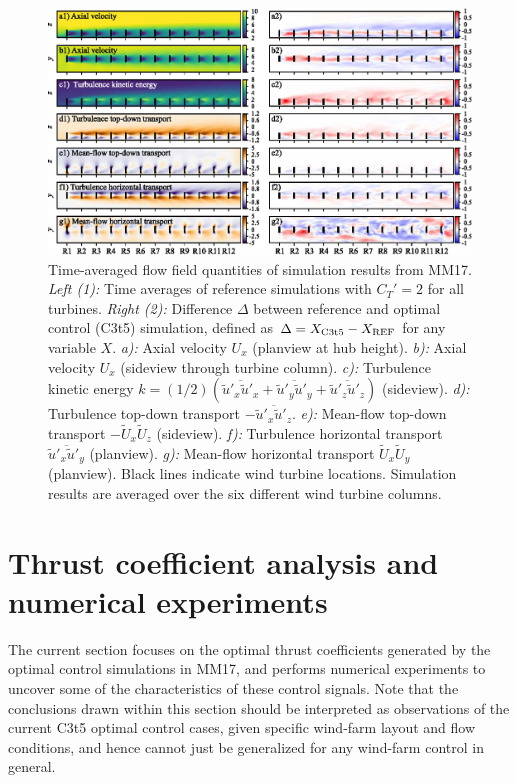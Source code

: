 \documentclass[wes, manuscript]{copernicus}
\newcommand{\revision}[1]{{\color{blue} #1}}
\begin{document}
\begin{figure}
	\includegraphics[width=\textwidth]{figure4}
	\caption{Time-averaged flow field quantities of simulation results from MM17. \emph{Left (1):} Time averages of reference simulations with $C_T' = 2$ for all turbines. \emph{Right (2):} Difference $\Delta$ between reference and optimal control (C3t5) simulation, defined as $\Delta = X_{\rm C3t5} - X_{\rm REF}$ for any variable $X$. \emph{a):} Axial velocity $U_x$ (planview at hub height). \emph{b):} Axial velocity $U_x$ (sideview through turbine column). \emph{c):} Turbulence kinetic energy $k = (1/2)(\overline{\widetilde{u}'_x \widetilde{u}'_x} + \overline{\widetilde{u}'_y \widetilde{u}'_y} + \overline{\widetilde{u}'_z \widetilde{u}'_z})$ (sideview). \emph{d):} Turbulence top-down transport $ - \overline{\widetilde{u}'_x\widetilde{u}'_z}$. \emph{e):} Mean-flow top-down transport $ - \widetilde{U}_x \widetilde{U}_z$ (sideview). \emph{f):} Turbulence horizontal transport $\overline{\widetilde{u}'_x \widetilde{u}'_y}$ (planview). \emph{g):} Mean-flow horizontal transport $\widetilde{U}_x \widetilde{U}_y$ (planview). Black lines indicate wind turbine locations. Simulation results are averaged over the six different wind turbine columns. \label{fig:flowfield_statistics}}
\end{figure}


\section{Thrust coefficient analysis and numerical experiments}\label{sec:analysis_controls_analysis}

The current section focuses on the optimal thrust coefficients generated by the optimal control simulations in MM17, and performs numerical experiments to uncover some of the characteristics of these control signals. \revision{Note that the conclusions drawn within this section should be interpreted as observations of the current C3t5 optimal control cases, given specific wind-farm layout and flow conditions, and hence cannot just be generalized for any wind-farm control in general.}
\end{document}
